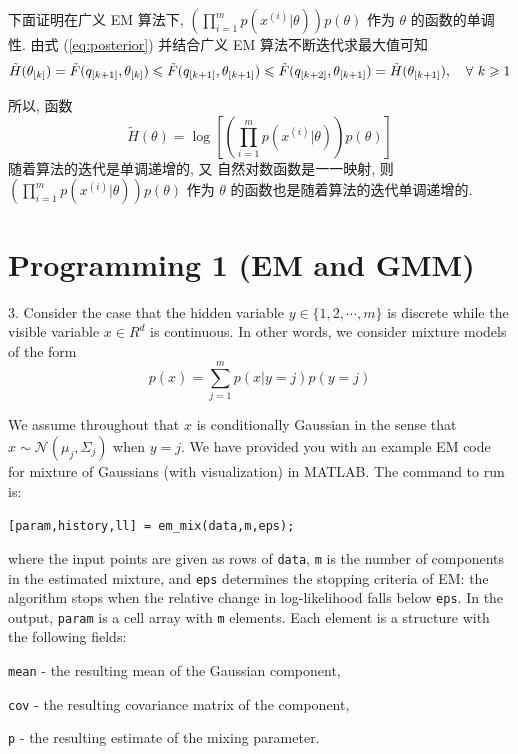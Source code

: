 \documentclass{article}
\begin{document}
下面证明在广义 EM 算法下, $\displaystyle\left(\prod_{i = 1}^mp(x^{(i)}|\theta)\right)p(\theta)$ 作为 $\theta$ 的函数的单调性. 由式 (\ref{eq:posterior}) 并结合广义 EM 算法不断迭代求最大值可知
\begin{equation}
  \tilde{H}(\theta_{[k]})=\tilde{F}(q_{[k+1]},\theta_{[k]})\leqslant\tilde{F}(q_{[k+1]},\theta_{[k+1]})\leqslant\tilde{F}(q_{[k+2]},\theta_{[k+1]})=\tilde{H}(\theta_{[k+1]}),\quad\forall~k\geqslant1
\end{equation}

所以, 函数
\begin{equation*}
  \tilde{H}(\theta)=\log\left[\left(\prod_{i = 1}^mp(x^{(i)}|\theta)\right)p(\theta)\right]
\end{equation*}
随着算法的迭代是单调递增的, 又 自然对数函数是一一映射, 则 $\displaystyle\left(\prod_{i = 1}^mp(x^{(i)}|\theta)\right)p(\theta)$ 作为 $\theta$ 的函数也是随着算法的迭代单调递增的.

\section*{Programming 1 (EM and GMM)}

3. Consider the case that the hidden variable $y \in \{1,2,\cdots,m\}$ is discrete while the visible variable $x \in R^d$ is continuous. In other words, we consider mixture models of the form
\begin{equation}
	p(x) = \sum_{j = 1}^m p(x|y = j)p(y=j)
\end{equation}

We assume throughout that $x$ is conditionally Gaussian in the sense that $x \sim \mathcal{N}(\mu_j, \Sigma_j)$ when $y = j$. We have provided you with an example EM code for mixture of Gaussians (with visualization) in MATLAB. The command to run is: 

\verb|[param,history,ll] = em_mix(data,m,eps);| 

where the input points are given as rows of \verb|data|, \verb|m| is the number of components in the estimated mixture, and \verb|eps| determines the stopping criteria of EM: the algorithm stops when the relative change in log-likelihood falls below \verb|eps|. In the output, \verb|param| is a cell array with \verb|m| elements. Each element is a structure with the following fields:

\verb|mean| - the resulting mean of the Gaussian component,

\verb|cov| - the resulting covariance matrix of the component,

\verb|p| - the resulting estimate of the mixing parameter.
\end{document}

